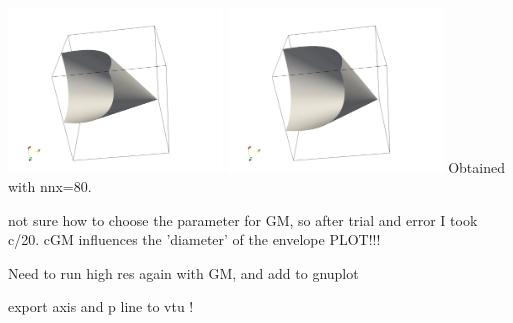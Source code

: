 \begin{center}
\includegraphics[width=5.7cm]{python_codes/fieldstone_159/images/DPm}
\includegraphics[width=5.7cm]{python_codes/fieldstone_159/images/DPc}
{\captionfont Obtained with nnx=80}.
\end{center}

not sure how to choose the parameter for GM, so after trial and error I took c/20.
cGM influences the 'diameter' of the envelope PLOT!!!


Need to run high res again with GM, and add to gnuplot

export axis and p line to vtu !

